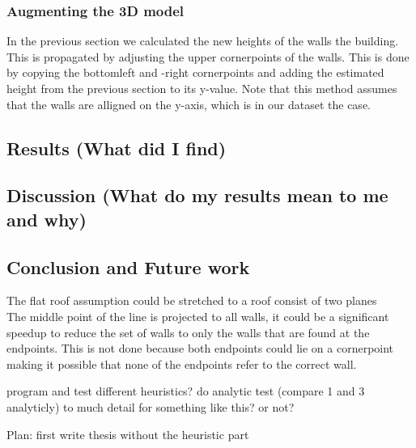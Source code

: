 \subsubsection{Augmenting the 3D model} %


	In the previous section we calculated the new heights of the walls the building. 
	This is propagated by adjusting the upper cornerpoints of the walls.
	This is done by copying the bottomleft and -right cornerpoints and adding the estimated height from the previous section to its y-value.
	Note that this method assumes that the walls are alligned on the y-axis, which is in our dataset the case.


\subsection{Results (What did I find)}
\subsection{Discussion (What do my results mean to me and why)}
\subsection{Conclusion and Future work}
The flat roof assumption could be stretched to a roof consist of two planes
\\
The middle point of the line is projected to all walls, it could be a significant speedup to reduce the set of walls to only the walls that are found at the endpoints. This is not done because both endpoints could lie on a cornerpoint making it possible that none of the endpoints refer to the correct wall.


program and test different heuristics?
do analytic test (compare 1 and 3 analyticly)
	to much detail for something like this? or not?

Plan:
first write thesis without the heuristic part

